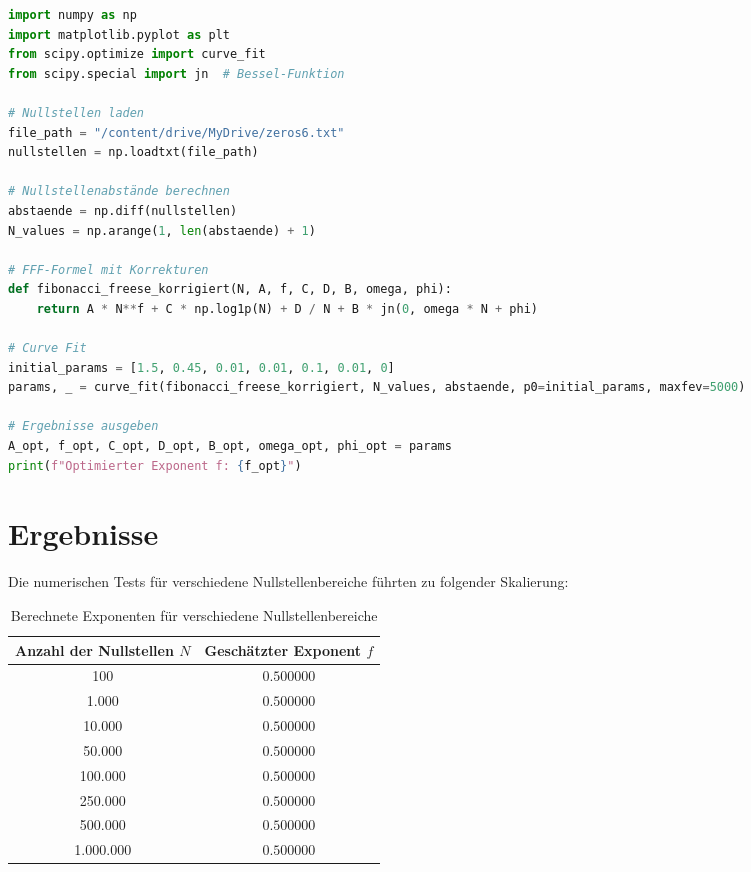 \documentclass[a4paper,11pt]{article}
\begin{document}
\begin{lstlisting}[language=Python, caption=Python-Code zur Berechnung des FFF-Exponenten, label=lst:python1, basicstyle=\ttfamily, keywordstyle=\color{blue}, commentstyle=\color{gray}, stringstyle=\color{red}]
import numpy as np
import matplotlib.pyplot as plt
from scipy.optimize import curve_fit
from scipy.special import jn  # Bessel-Funktion

# Nullstellen laden
file_path = "/content/drive/MyDrive/zeros6.txt"
nullstellen = np.loadtxt(file_path)

# Nullstellenabstände berechnen
abstaende = np.diff(nullstellen)
N_values = np.arange(1, len(abstaende) + 1)

# FFF-Formel mit Korrekturen
def fibonacci_freese_korrigiert(N, A, f, C, D, B, omega, phi):
    return A * N**f + C * np.log1p(N) + D / N + B * jn(0, omega * N + phi)

# Curve Fit
initial_params = [1.5, 0.45, 0.01, 0.01, 0.1, 0.01, 0]
params, _ = curve_fit(fibonacci_freese_korrigiert, N_values, abstaende, p0=initial_params, maxfev=5000)

# Ergebnisse ausgeben
A_opt, f_opt, C_opt, D_opt, B_opt, omega_opt, phi_opt = params
print(f"Optimierter Exponent f: {f_opt}")
\end{lstlisting}

\section{Ergebnisse}

Die numerischen Tests für verschiedene Nullstellenbereiche führten zu folgender Skalierung:

\begin{table}[h]
    \centering
    \begin{tabular}{|c|c|}
        \hline
        Anzahl der Nullstellen \( N \) & Geschätzter Exponent \( f \) \\
        \hline
        100 & \( 0.500000 \) \\
        1.000 & \( 0.500000 \) \\
        10.000 & \( 0.500000 \) \\
        50.000 & \( 0.500000 \) \\
        100.000 & \( 0.500000 \) \\
        250.000 & \( 0.500000 \) \\
        500.000 & \( 0.500000 \) \\
        1.000.000 & \( 0.500000 \) \\
        \hline
    \end{tabular}
    \caption{Berechnete Exponenten für verschiedene Nullstellenbereiche}
    \label{tab:exponenten}
\end{table}
\end{document}
